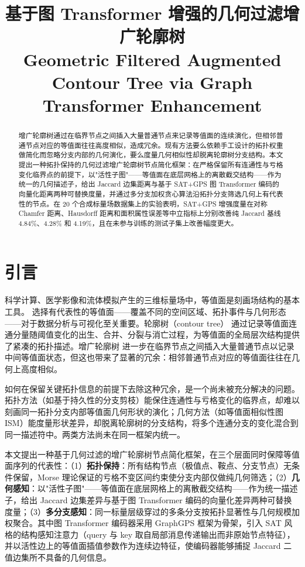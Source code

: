 \documentclass[twocolumn, a4paper, 10pt]{article}
\title{\textbf{基于图 Transformer 增强的几何过滤增广轮廓树}\\[6pt]
  \large\textmd{Geometric Filtered Augmented Contour Tree via Graph Transformer Enhancement}}
\author{}
\date{}
\begin{document}
\raggedbottom
\sloppy
\setlength{\emergencystretch}{2em}
\setlength{\parindent}{2em}
\setlength{\parskip}{0pt}

\maketitle

\begin{abstract}
增广轮廓树通过在临界节点之间插入大量普通节点来记录等值面的连续演化，但相邻普通节点对应的等值面往往高度相似，造成冗余。现有方法要么依赖手工设计的拓扑权重做简化而忽略分支内部的几何演化，要么度量几何相似性却脱离轮廓树分支结构。本文提出一种拓扑保持的几何过滤增广轮廓树节点简化框架：在严格保留所有连通性与亏格变化临界点的前提下，以"活性子图"——等值面在底层网格上的离散截交结构——作为统一的几何描述子，给出 Jaccard 边集距离与基于 SAT+GPS 图 Transformer 编码的向量化距离两种可替换度量，并通过多分支加权贪心算法沿拓扑分支筛选几何上有代表性的节点。在 20 个合成标量场数据集上的实验表明，SAT+GPS 增强度量在对称 Chamfer 距离、Hausdorff 距离和面积属性误差等中立指标上分别改善纯 Jaccard 基线 4.84\%、4.28\% 和 4.19\%，且在未参与训练的测试子集上改善幅度更大。
\end{abstract}

\section{引言}

科学计算、医学影像和流体模拟产生的三维标量场中，等值面是刻画场结构的基本工具。\cite{lorensen_cline_1987} 选择有代表性的等值面——覆盖不同的空间区域、拓扑事件与几何形态——对于数据分析与可视化至关重要。轮廓树（contour tree）\cite{van_kreveld_1997,carr_contour_2003} 通过记录等值面连通分量随阈值变化的出生、合并、分裂与消亡过程，为等值面的全局层次结构提供了紧凑的拓扑描述。增广轮廓树\cite{gueunet_act_2019} 进一步在临界节点之间插入大量普通节点以记录中间等值面状态，但这也带来了显著的冗余：相邻普通节点对应的等值面往往在几何上高度相似。

如何在保留关键拓扑信息的前提下去除这种冗余，是一个尚未被充分解决的问题。拓扑方法（如基于持久性的分支剪枝\cite{edelsbrunner_persistence_2002,carr_geometric_2004}）能保住连通性与亏格变化的临界点，却难以刻画同一拓扑分支内部等值面几何形状的演化；几何方法（如等值面相似性图 ISM\cite{bruckner_ism_2010}）能度量形状差异，却脱离轮廓树的分支结构，将多个连通分支的变化混合到同一描述符中。两类方法尚未在同一框架内统一。

本文提出一种基于几何过滤的增广轮廓树节点简化框架，在三个层面同时保障等值面序列的代表性：（1）\textbf{拓扑保持}：所有结构节点（极值点、鞍点、分支节点）无条件保留，Morse 理论保证的亏格不变区间约束使分支内部仅做纯几何筛选；（2）\textbf{几何感知}：以"活性子图"——等值面在底层网格上的离散截交结构——作为统一描述子，给出 Jaccard 边集差异与基于图 Transformer 编码的向量化差异两种可替换度量；（3）\textbf{多分支感知}：同一标量层级穿过的多条分支按拓扑显著性与几何规模加权聚合。其中图 Transformer 编码器采用 GraphGPS\cite{rampasek_gps_2022} 框架为骨架，引入 SAT\cite{chen_sat_2022} 风格的结构感知注意力（query 与 key 取自局部消息传递输出而非原始节点特征），并以活性边上的等值面插值参数作为连续边特征，使编码器能够捕捉 Jaccard 二值边集所不具备的几何信息。
\end{document}
